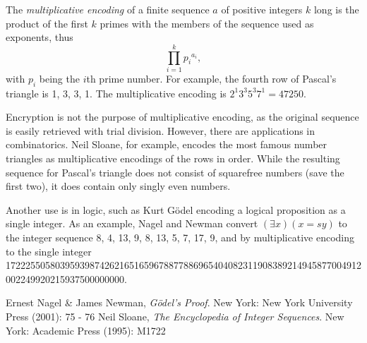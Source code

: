 \documentclass[12pt]{article}
\begin{document}
The {\em multiplicative encoding} of a finite sequence $a$ of positive integers $k$ long is the product of the first $k$ primes with the members of the sequence used as exponents, thus $$\prod_{i = 1}^k {p_i}^{a_i},$$ with $p_i$ being the $i$th prime number. For example, the fourth row of Pascal's triangle is 1, 3, 3, 1. The multiplicative encoding is $2^1 3^3 5^3 7^1 = 47250$.

Encryption is not the purpose of multiplicative encoding, as the original sequence is easily retrieved  with trial division. However, there are applications in combinatorics. Neil Sloane, for example, encodes the most famous number triangles as multiplicative encodings of the rows in order. While the resulting sequence for Pascal's triangle does not consist of squarefree numbers (save the first two), it does contain only singly even numbers.

Another use is in logic, such as Kurt G\"odel encoding a logical proposition as a single integer. As an example, Nagel and Newman convert $(\exists x)(x = sy)$ to the integer sequence 8, 4, 13, 9, 8, 13, 5, 7, 17, 9, and by multiplicative encoding to the single integer 172225505803959398742621651659678877886965404082311908389214945877004912002249920215937500000000.

\begin{thebibliography}{2}
 Ernest Nagel \& James Newman, {\it G\"odel's Proof}. New York: New York University Press (2001): 75 - 76
 Neil Sloane, {\it The Encyclopedia of Integer Sequences}. New York: Academic Press (1995): M1722
\end{thebibliography}
\end{document}

